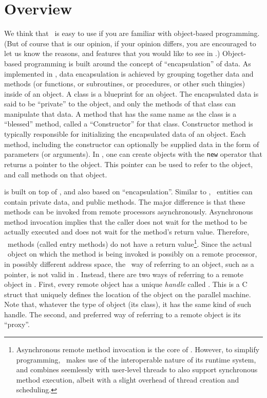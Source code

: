 \chapter{\charmpp{} Overview}

We think that \charmpp\ is easy to use if you are familiar with object-based
programming. (But of course that is our opinion, if your opinion differs, you
are encouraged to let us know the reasons, and features that you would like to
see in \charmpp.) Object-based programming is built around the concept of
``encapsulation'' of data. As implemented in \CC, data encapsulation is
achieved by grouping together data and methods (or functions, or subroutines,
or procedures, or other such thingies) inside of an object. A class is a
blueprint for an object.  The encapsulated data is said to be ``private'' to
the object, and only the methods of that class can manipulate that data. A
method that has the same name as the class is a ``blessed'' method, called a
``Constructor'' for that class.  Constructor method is typically responsible
for initializing the encapsulated data of an object. Each method, including the
constructor can optionally be supplied data in the form of parameters (or
arguments). In \CC, one can create objects with the {\tt new} operator that
returns a pointer to the object. This pointer can be used to refer to the
object, and call methods on that object.

\charmpp{} is built on top of \CC, and also based on ``encapsulation''. Similar
to \CC, \charmpp\ entities can contain private data, and public methods. The
major difference is that these methods can be invoked from remote processors
asynchronously.  Asynchronous method invocation implies that the caller does
not wait for the method to be actually executed and does not wait for the
method's return value. Therefore, \charmpp\ methods (called entry methods) do
not have a return value\footnote{Asynchronous remote method invocation is the
core of \charmpp. However, to simplify programming, \charmpp\ makes use of the
interoperable nature of its runtime system, and combines seemlessly with
user-level threads to also support synchronous method execution, albeit with a
slight overhead of thread creation and scheduling.}. Since the actual \charmpp\
object on which the method is being invoked is possibly on a remote processor,
in possibly different address space, the \CC\ way of referring to an object,
such as a pointer, is not valid in \charmpp.  Instead, there are two ways of
referring to a remote object in \charmpp. First, every remote object has a
unique {\em handle} called \kw{ChareID}. This is a C struct that uniquely
defines the location of the object on the parallel machine. Note that, whatever
the type of object (its class), it has the same kind of such handle. The
second, and preferred way of referring to a remote object is its ``proxy''.

